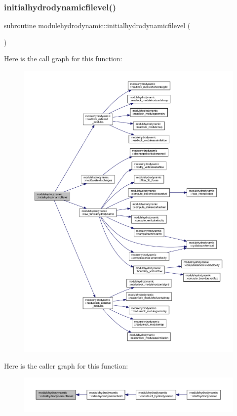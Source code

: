 \subsubsection{\texorpdfstring{initialhydrodynamicfilevel()}{initialhydrodynamicfilevel()}}
{\footnotesize\ttfamily subroutine modulehydrodynamic\+::initialhydrodynamicfilevel (\begin{DoxyParamCaption}{ }\end{DoxyParamCaption})\hspace{0.3cm}{\ttfamily [private]}}

Here is the call graph for this function\+:\nopagebreak
\begin{figure}[H]
\begin{center}
\leavevmode
\includegraphics[width=350pt]{namespacemodulehydrodynamic_acc95ab35ad823a54bc0cab6a88e60830_cgraph}
\end{center}
\end{figure}
Here is the caller graph for this function\+:\nopagebreak
\begin{figure}[H]
\begin{center}
\leavevmode
\includegraphics[width=350pt]{namespacemodulehydrodynamic_acc95ab35ad823a54bc0cab6a88e60830_icgraph}
\end{center}
\end{figure}
